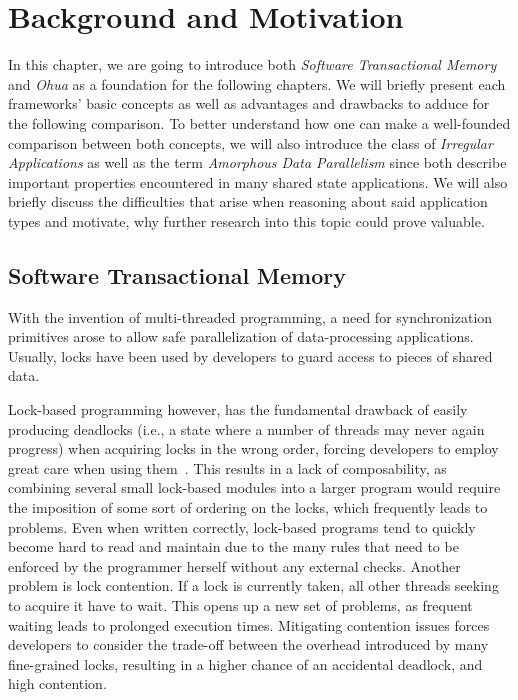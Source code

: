 %
\chapter{Background and Motivation}%
\label{sec:background}

In this chapter, we are going to introduce both \emph{Software Transactional Memory} and \emph{Ohua} as a foundation for the following chapters.
We will briefly present each frameworks' basic concepts as well as advantages and drawbacks to adduce for the following comparison.
To better understand how one can make a well-founded comparison between both concepts, we will also introduce the class of \emph{Irregular Applications} as well as the term \emph{Amorphous Data Parallelism} since both describe important properties encountered in many shared state applications.
We will also briefly discuss the difficulties that arise when reasoning about said application types and motivate, why further research into this topic could prove valuable.

\section{Software Transactional Memory}
\label{sec:background:stm}

With the invention of multi-threaded programming, a need for synchronization primitives arose to allow safe parallelization of data-processing applications.
Usually, locks have been used by developers to guard access to pieces of shared data.

Lock-based programming however, has the fundamental drawback of easily producing deadlocks (i.e., a state where a number of threads may never again progress) when acquiring locks in the wrong order, forcing developers to employ great care when using them~\cite{lee2006problem}.
This results in a lack of composability, as combining several small lock-based modules into a larger program would require the imposition of some sort of ordering on the locks, which frequently leads to problems.
Even when written correctly, lock-based programs tend to quickly become hard to read and maintain due to the many rules that need to be enforced by the programmer herself without any external checks.
Another problem is lock contention.
If a lock is currently taken, all other threads seeking to acquire it have to wait.
This opens up a new set of problems, as frequent waiting leads to prolonged execution times.
Mitigating contention issues forces developers to consider the trade-off between the overhead introduced by many fine-grained locks, resulting in a higher chance of an accidental deadlock, and high contention.

